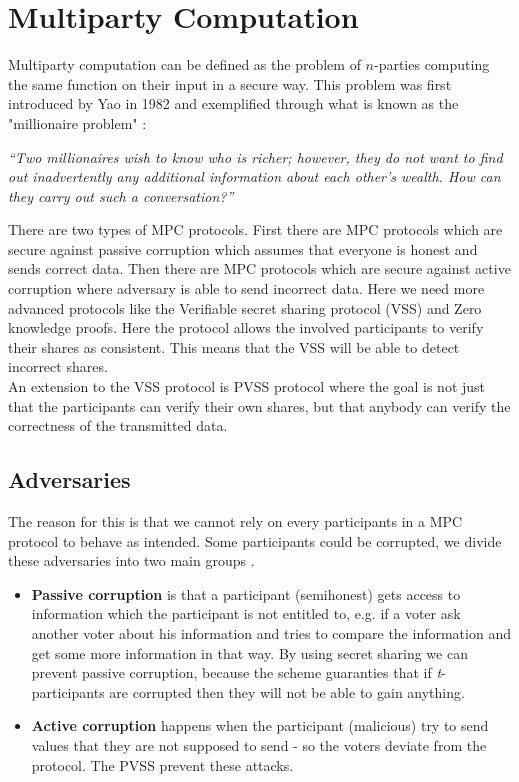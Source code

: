 \section{Multiparty Computation}
Multiparty computation can be defined as the problem of $n$-parties computing the same function on their input in a secure way.  This problem was first introduced by Yao in 1982 and exemplified through what is known as the "millionaire problem" \cite{Yao82}:

\begin{center}
\textit{“Two millionaires wish to know who is richer; however, they do not want to find out inadvertently any additional information about each other’s wealth. How can they carry out such a conversation?”}
\end{center}

\noindent
There are two types of MPC protocols. First there are MPC protocols which are secure against passive corruption which assumes that everyone is honest and sends correct data. Then there are MPC protocols which are secure against active corruption where adversary is able to send incorrect data. Here we need more advanced protocols like the Verifiable secret sharing protocol (VSS) and Zero knowledge proofs. Here the protocol allows the involved participants to verify their shares as consistent. This means that the VSS will be able to detect incorrect shares. \\



\noindent
An extension to the VSS protocol is PVSS protocol where the goal is not just that the participants can verify their own shares, but that anybody can verify the correctness of the transmitted data. 

\subsection{Adversaries}
The reason for this is that we cannot rely on every participants in a MPC protocol to behave as intended. Some participants could be corrupted, we divide these adversaries into two main groups \cite{IntroCrypto}. 

\begin{itemize}
\item \textbf{Passive corruption} is that a participant (semihonest) gets access to information which the participant is not entitled to, e.g. if a voter ask another voter about his information and tries to compare the information and get some more information in that way. By using secret sharing we can prevent passive corruption, because the scheme guaranties that if \textit{t}-participants are corrupted then they will not be able to gain anything.

\item \textbf{Active corruption} happens when the participant (malicious) try to send values that they are not supposed to send - so the voters deviate from the protocol. The PVSS prevent these attacks.
\end{itemize}
